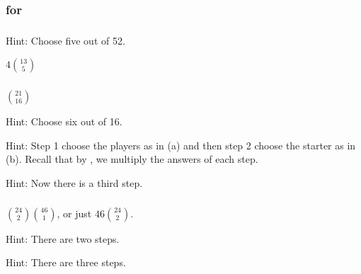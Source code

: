 
\subsubsection{\answers for  \subcombinecount}

\subsubsection*{ \answers}
    \begin{apart}
        \item Hint: Choose five out of 52.
        \item $4\binom{13}{5}$
    \end{apart}

\subsubsection*{ \answers}
    \begin{apart}
        \item $\binom{21}{16}$
        \item Hint: Choose six out of 16.
        \item Hint: Step 1 choose the players as in (a) and then step 2 choose the starter as in (b).  Recall that by , we multiply the answers of each step.
        \item Hint: Now there is a third step.
    \end{apart}

\subsubsection*{ \answers}
    \begin{apart}
        \item $\binom{24}{2}\binom{46}{1}$, or just $46\binom{24}{2}$.
        \item Hint: There are two steps.
        \item Hint: There are three steps.
    \end{apart}

